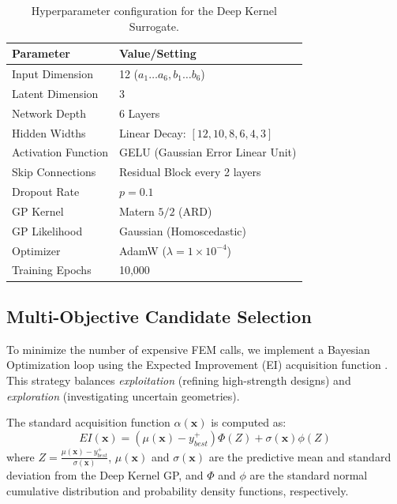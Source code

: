 \documentclass[
  preprint,
  12pt,
  a4paper
]{elsarticle}
\begin{document}
\begin{table}[htbp]
    \centering
    \caption{Hyperparameter configuration for the Deep Kernel Surrogate.}
    \label{tab:hyperparameters}
    \begin{tabular}{l l}
        \toprule
        \textbf{Parameter} & \textbf{Value/Setting} \\
        \midrule
        Input Dimension & 12 ($a_1\dots a_6, b_1\dots b_6$) \\
        Latent Dimension & 3 \\
        Network Depth & 6 Layers \\
        Hidden Widths & Linear Decay: $[12, 10, 8, 6, 4, 3]$ \\
        Activation Function & GELU (Gaussian Error Linear Unit) \\
        Skip Connections & Residual Block every 2 layers \\
        Dropout Rate & $p=0.1$ \\
        \midrule
        GP Kernel & Matern $5/2$ (ARD) \\
        GP Likelihood & Gaussian (Homoscedastic) \\
        Optimizer & AdamW ($\lambda=1\times 10^{-4}$) \\
        Training Epochs & 10,000 \\
        \bottomrule
    \end{tabular}
\end{table}

\subsection{Multi-Objective Candidate Selection}
To minimize the number of expensive FEM calls, we implement a Bayesian Optimization loop using the Expected Improvement (EI) acquisition function \cite{jones1998efficient}. This strategy balances \textit{exploitation} (refining high-strength designs) and \textit{exploration} (investigating uncertain geometries).

The standard acquisition function $\alpha(\mathbf{x})$ is computed as:
\begin{equation}
    EI(\mathbf{x}) = (\mu(\mathbf{x}) - y_{best}^+) \Phi(Z) + \sigma(\mathbf{x}) \phi(Z)
\end{equation}
where $Z = \frac{\mu(\mathbf{x}) - y_{best}^+}{\sigma(\mathbf{x})}$, $\mu(\mathbf{x})$ and $\sigma(\mathbf{x})$ are the predictive mean and standard deviation from the Deep Kernel GP, and $\Phi$ and $\phi$ are the standard normal cumulative distribution and probability density functions, respectively.
\end{document}
